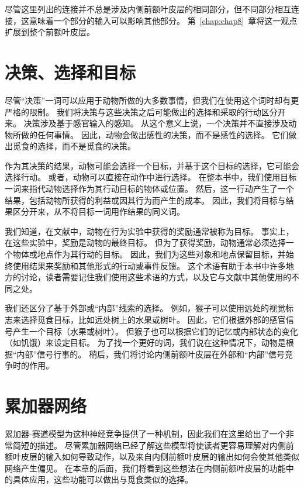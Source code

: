 尽管这里列出的连接并不总是涉及内侧前额叶皮层的相同部分，但不同部分相互连接\cite{barbas2000connections}，这意味着一个部分的输入可以影响其他部分。
第~\ref{chap:chap8}~章将这一观点扩展到整个前额叶皮层。\par



\section{决策、选择和目标}

尽管“决策”一词可以应用于动物所做的大多数事情，但我们在使用这个词时却有更严格的限制。
我们将决策与这些决策之后可能做出的选择和采取的行动区分开来\cite{schall2001neural}。
决策涉及基于感官输入的感知。
从这个意义上说，一个决策并不直接涉及动物所做的任何事情。
因此，动物会做出感性的决策，而不是感性的选择。
它们做出觅食的选择，而不是觅食的决策。\par


作为其决策的结果，动物可能会选择一个目标，并基于这个目标的选择，它可能会选择行动。
或者，动物可以直接在动作中进行选择。
在整本书中，我们使用目标一词来指代动物选择作为其行动目标的物体或位置。
然后，这一行动产生了一个结果，包括动物所获得的利益或因其行为而产生的成本。
因此，我们将目标与结果区分开来，从不将目标一词用作结果的同义词。\par


我们知道，在文献中，动物在行为实验中获得的奖励通常被称为目标。
事实上，在这些实验中，奖励是动物的最终目标。
但为了获得奖励，动物通常必须选择一个物体或地点作为其行动的目标。
因此，我们为这些对象和地点保留目标，并始终使用结果来奖励和其他形式的行动或事件反馈。
这个术语有助于本书中许多地方的讨论，读者需要记住我们使用这些术语的方式，以及它与文献中其他使用的不同之处。\par


我们还区分了基于外部或“内部”线索的选择\cite{Passingham et al.2010}。
例如，猴子可以使用远处的视觉标志来选择觅食目标，比如远处树上的水果或树叶。
因此，它们根据外部的感官信号产生一个目标（水果或树叶）。
但猴子也可以根据它们的记忆或内部状态的变化（如饥饿）来设定目标。
为了找一个更好的词，我们说在这种情况下，动物是根据“内部”信号行事的。
稍后，我们将讨论内侧前额叶皮层在外部和“内部”信号竞争时的作用。\par



\section{累加器网络}

累加器-赛道模型为这种神经竞争提供了一种机制，因此我们在这里给出了一个非常简短的描述。
尽管累加器网络已经了解这些模型将使读者更容易理解对内侧前额叶皮层的输入如何导致动作，以及来自内侧前额叶皮层的输出如何会使其他类似网络产生偏见。
在本章的后面，我们将看到这些想法在内侧前额叶皮层的功能中的具体应用，这些功能可以做出与觅食类似的选择。\par


